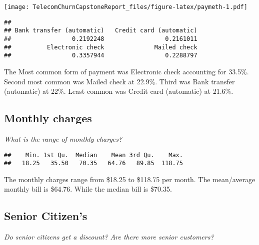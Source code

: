 \documentclass[]{article}
\newenvironment{Shaded}{\begin{snugshade}}{\end{snugshade}}
\newcommand{\KeywordTok}[1]{\textcolor[rgb]{0.13,0.29,0.53}{\textbf{#1}}}
\newcommand{\OperatorTok}[1]{\textcolor[rgb]{0.81,0.36,0.00}{\textbf{#1}}}
\newcommand{\NormalTok}[1]{#1}
\begin{document}
\texttt{[image: TelecomChurnCapstoneReport\_files/figure-latex/paymeth-1.pdf]}

\begin{Shaded}
\end{Shaded}

\begin{verbatim}
## 
## Bank transfer (automatic)   Credit card (automatic) 
##                 0.2192248                 0.2161011 
##          Electronic check              Mailed check 
##                 0.3357944                 0.2288797
\end{verbatim}

The Most common form of payment was Electronic check accounting for
33.5\%. Second most common was Mailed check at 22.9\%. Third was Bank
transfer (automatic) at 22\%. Least common was Credit card (automatic)
at 21.6\%.

\subsection{Monthly charges}\label{monthly-charges}

\emph{What is the range of monthly charges?}

\begin{Shaded}
\end{Shaded}

\begin{verbatim}
##    Min. 1st Qu.  Median    Mean 3rd Qu.    Max. 
##   18.25   35.50   70.35   64.76   89.85  118.75
\end{verbatim}

The monthly charges range from \$18.25 to \$118.75 per month. The
mean/average monthly bill is \$64.76. While the median bill is \$70.35.

\subsection{Senior Citizen's}\label{senior-citizens}

\emph{Do senior citizens get a discount? Are there more senior
customers? }
\end{document}
